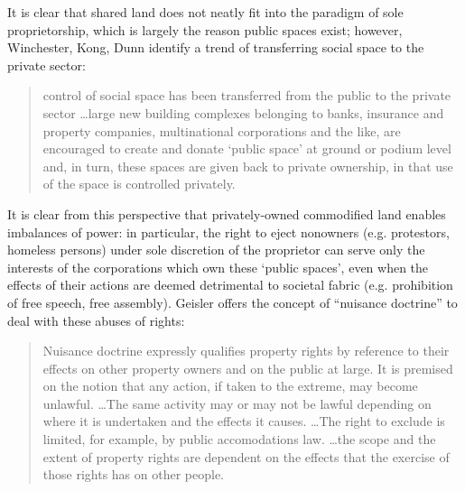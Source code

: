 \documentclass[12pt, letterpaper, oneside]{article}
\begin{document}
It is clear that shared land does not neatly fit into the paradigm of sole proprietorship, which is largely the reason public spaces exist; however, Winchester, Kong, Dunn identify a trend of transferring social space to the private sector:
\begin{quote}
control of social space has been transferred from the public to the private sector \ldots large new building complexes belonging to banks, insurance and property companies, multinational corporations and the like, are encouraged to create and donate `public space' at ground or podium level and, in turn, these spaces are given back to private ownership, in that use of the space is controlled privately.

\autocite{winchester2013landscapes}
\end{quote}
It is clear from this perspective that privately-owned commodified land enables imbalances of power: in particular, the right to eject nonowners (e.g. protestors, homeless persons) under sole discretion of the proprietor can serve only the interests of the corporations which own these `public spaces', even when the effects of their actions are deemed detrimental to societal fabric (e.g. prohibition of free speech, free assembly). Geisler offers the concept of ``nuisance doctrine'' to deal with these abuses of rights:
\begin{quote}
Nuisance doctrine expressly qualifies property rights by reference to their effects on other property owners and on the public at large. It is premised on the notion that any action, if taken to the extreme, may become unlawful. \ldots The same activity may or may not be lawful depending on where it is undertaken and the effects it causes. \ldots The right to exclude is limited, for example, by public accomodations law. \ldots the scope and the extent of property rights are dependent on the effects that the exercise of those rights has on other people.

\autocite{geisler2000property}
\end{quote}
\end{document}
